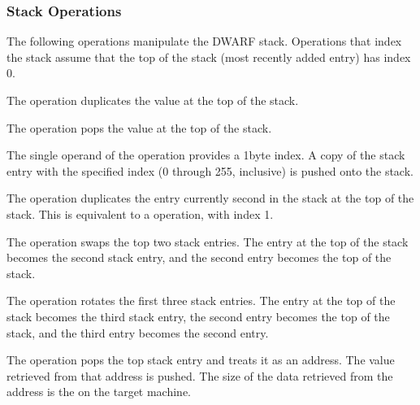 \subsubsection{Stack Operations}
\label{chap:stackoperations}
The following 
operations manipulate the DWARF stack. Operations
that index the stack assume that the top of the stack (most
recently added entry) has index 0.
\begin{enumerate}[1. ]
The  operation duplicates the value at the top of the stack.

The  operation pops the value at the top of the stack.

The single operand of the  operation provides a
1\dash byte index. A copy of the stack entry with the specified
index (0 through 255, inclusive) is pushed onto the stack.

The  operation duplicates the entry currently second
in the stack at the top of the stack. 
This is equivalent to
a  operation, with index 1.  

The  operation swaps the top two stack entries. 
The entry at the top of the
stack becomes the second stack entry, 
and the second entry becomes the top of the stack.

The  operation rotates the first three stack
entries. The entry at the top of the stack becomes the third
stack entry, the second entry becomes the top of the stack,
and the third entry becomes the second entry.

The  
operation  pops the top stack entry and 
treats it as an address. The value
retrieved from that address is pushed. 
The size of the data retrieved from the 
address is the  on the target machine.


\end{enumerate}
